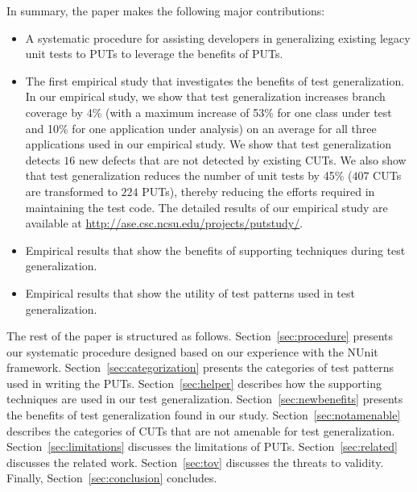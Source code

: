 In summary, the paper makes the following major contributions:
\begin{itemize}
	\item A systematic procedure for assisting developers in generalizing existing legacy unit tests to PUTs to leverage the benefits of PUTs.
	\item The first empirical study that investigates the benefits of test generalization. In our empirical study, we show that test generalization increases branch coverage by 4\% (with a maximum increase of 53\% for one class under test and 10\% for one application under analysis) on an average for all three applications used in our empirical study. We show that test generalization detects $16$ new defects that are not detected by existing CUTs. We also show that test generalization reduces the number of unit tests by 45\% ($407$ CUTs are transformed to $224$ PUTs), thereby reducing the efforts required in maintaining the test code. The detailed results of our empirical study are available at \url{http://ase.csc.ncsu.edu/projects/putstudy/}.	
	\item Empirical results that show the benefits of supporting techniques during test generalization. 
	\item Empirical results that show the utility of test patterns used in test generalization.
\end{itemize}

The rest of the paper is structured as follows. 
Section~\ref{sec:procedure} presents our systematic procedure designed based on our experience with the NUnit framework.
Section~\ref{sec:categorization} presents the categories of test patterns used in writing the PUTs. 
Section~\ref{sec:helper} describes how the supporting techniques are used in our test generalization. 
Section~\ref{sec:newbenefits} presents the benefits of test generalization found in our study. 
Section~\ref{sec:notamenable} describes the categories of CUTs that are not amenable for test generalization.
Section~\ref{sec:limitations} discusses the limitations of PUTs. Section~\ref{sec:related} discusses the related work. Section~\ref{sec:tov} discusses the threats to validity. Finally, Section~\ref{sec:conclusion} concludes.



